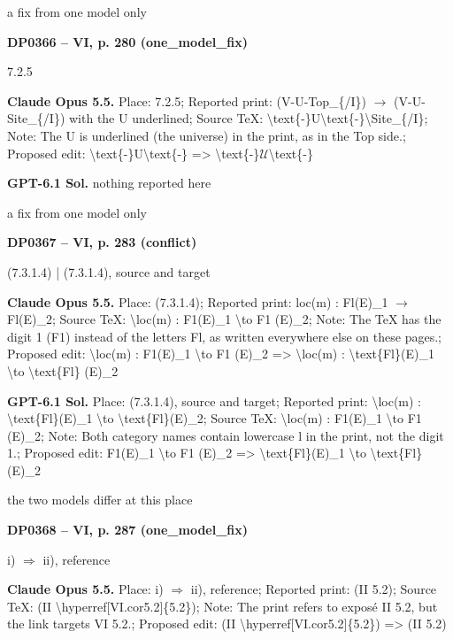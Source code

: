a fix from one model only\par
\par\noindent\hypertarget{DP0366}{}\textbf{DP0366 -- VI, p. 280 (one\_model\_fix)}\par
7.2.5\par
\textbf{Claude Opus 5.5.} Place: 7.2.5; Reported print: (V-U-Top\_\{/I\}) \ensuremath{\to} (V-U-Site\_\{/I\}) with the U underlined; Source TeX: \textbackslash{}text\{-\}U\textbackslash{}text\{-\}\textbackslash{}Site\_\{/I\}; Note: The U is underlined (the universe) in the print, as in the Top side.; Proposed edit: \textbackslash{}text\{-\}U\textbackslash{}text\{-\} =\allowbreak > \textbackslash{}text\{-\}\ensuremath{𝒰}\textbackslash{}text\{-\}\par
\textbf{GPT-6.1 Sol.} nothing reported here\par
a fix from one model only\par
\par\noindent\hypertarget{DP0367}{}\textbf{DP0367 -- VI, p. 283 (conflict)}\par
(7.3.1.4) | (7.3.1.4), source and target\par
\textbf{Claude Opus 5.5.} Place: (7.3.1.4); Reported print: loc(m) : Fl(E)\_1 \ensuremath{\to} Fl(E)\_2; Source TeX: \textbackslash{}loc(m) : F1(E)\_1 \textbackslash{}to F1 (E)\_2; Note: The TeX has the digit 1 (F1) instead of the letters Fl, as written everywhere else on these pages.; Proposed edit: \textbackslash{}loc(m) : F1(E)\_1 \textbackslash{}to F1 (E)\_2 =\allowbreak > \textbackslash{}loc(m) : \textbackslash{}text\{Fl\}(E)\_1 \textbackslash{}to \textbackslash{}text\{Fl\} (E)\_2\par
\textbf{GPT-6.1 Sol.} Place: (7.3.1.4), source and target; Reported print: \textbackslash{}loc(m) : \textbackslash{}text\{Fl\}(E)\_1 \textbackslash{}to \textbackslash{}text\{Fl\}(E)\_2; Source TeX: \textbackslash{}loc(m) : F1(E)\_1 \textbackslash{}to F1 (E)\_2; Note: Both category names contain lowercase l in the print, not the digit 1.; Proposed edit: F1(E)\_1 \textbackslash{}to F1 (E)\_2 =\allowbreak > \textbackslash{}text\{Fl\}(E)\_1 \textbackslash{}to \textbackslash{}text\{Fl\}(E)\_2\par
the two models differ at this place\par
\par\noindent\hypertarget{DP0368}{}\textbf{DP0368 -- VI, p. 287 (one\_model\_fix)}\par
i) \ensuremath{\Rightarrow} ii), reference\par
\textbf{Claude Opus 5.5.} Place: i) \ensuremath{\Rightarrow} ii), reference; Reported print: (II 5.2); Source TeX: (II \textbackslash{}hyperref[VI.cor5.2]\{5.2\}); Note: The print refers to exposé II 5.2, but the link targets VI 5.2.; Proposed edit: (II \textbackslash{}hyperref[VI.cor5.2]\{5.2\}) =\allowbreak > (II 5.2)\par
